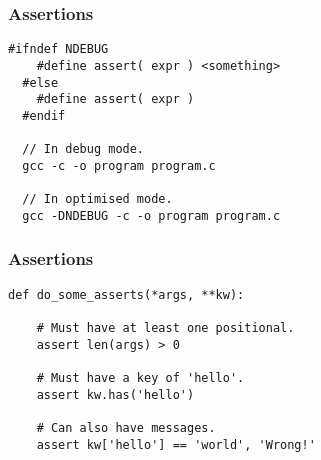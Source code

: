 \begin{frame}[fragile]
  \frametitle{Assertions}
  \begin{example}
    \begin{lstlisting}[style=C]
  #ifndef NDEBUG
    #define assert( expr ) <something>
  #else
    #define assert( expr )
  #endif

  // In debug mode.
  gcc -c -o program program.c

  // In optimised mode.
  gcc -DNDEBUG -c -o program program.c
    \end{lstlisting}
  \end{example}
\end{frame}

\begin{frame}[fragile]
  \frametitle{Assertions}
  \begin{example}
    \begin{lstlisting}[style=Py]
  def do_some_asserts(*args, **kw):

    # Must have at least one positional.
    assert len(args) > 0

    # Must have a key of 'hello'.
    assert kw.has('hello')

    # Can also have messages.
    assert kw['hello'] == 'world', 'Wrong!'
    
    \end{lstlisting}
  \end{example}
\end{frame}
